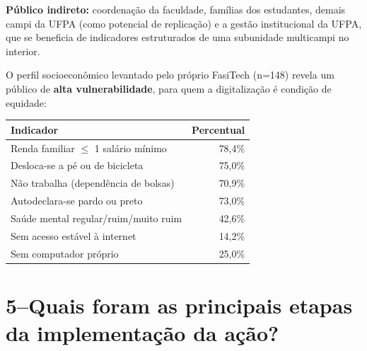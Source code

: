 \documentclass[12pt,a4paper]{article}
\begin{document}
\noindent\textbf{Público indireto:} coordenação da faculdade, famílias dos estudantes,
demais campi da UFPA (como potencial de replicação) e a gestão institucional da UFPA,
que se beneficia de indicadores estruturados de uma subunidade multicampi no interior.

\medskip
O perfil socioeconômico levantado pelo próprio FasiTech (n=148) revela um público de
\textbf{alta vulnerabilidade}, para quem a digitalização é condição de equidade:

\begin{center}
\renewcommand{\arraystretch}{1.15}
\begin{tabular}{L{7.8cm} r}
\toprule
\textbf{Indicador} & \textbf{Percentual} \\
\midrule
Renda familiar $\leq$ 1 salário mínimo      & 78,4\% \\
Desloca-se a pé ou de bicicleta             & 75,0\% \\
Não trabalha (dependência de bolsas)        & 70,9\% \\
Autodeclara-se pardo ou preto               & 73,0\% \\
Saúde mental regular/ruim/muito ruim        & 42,6\% \\
Sem acesso estável à internet               & 14,2\% \\
Sem computador próprio                      & 25,0\% \\
\bottomrule
\end{tabular}
\end{center}

\section{5\;–\;Quais foram as principais etapas da implementação da ação?}
\end{document}
